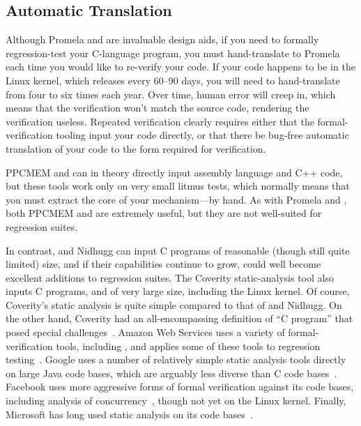 \subsection{Automatic Translation}
\label{sec:future:Automatic Translation}

Although Promela and 
are invaluable design aids, if you need to formally regression-test
your C-language program, you must hand-translate to Promela each time
you would like to re-verify your code.
If your code happens to be in the Linux kernel, which releases every
60--90 days, you will need to hand-translate from four to six times
each year.
Over time, human error will creep in, which means that the verification
won't match the source code, rendering the verification useless.
Repeated verification clearly requires either that the formal-verification
tooling input your code directly, or that there be bug-free automatic
translation of your code to the form required for verification.

PPCMEM and  can in theory directly input assembly language
and C++ code, but these tools work only on very small litmus tests,
which normally means that you must extract the core of your
mechanism---by hand.
As with Promela and , both PPCMEM and  are
extremely useful, but they are not well-suited for regression suites.

In contrast,  and Nidhugg can input C programs of reasonable
(though still quite limited) size, and if their capabilities continue
to grow, could well become excellent additions to regression suites.
The Coverity static-analysis tool also inputs C programs, and of very
large size, including the Linux kernel.
Of course, Coverity's static analysis is quite simple compared to that
of  and Nidhugg.
On the other hand, Coverity had an all-encompassing definition of
``C program'' that posed special challenges~\cite{AlBessey2010BillionLoCLater}.
Amazon Web Services uses a variety of formal-verification tools,
including , and applies some of these tools to regression
testing~\cite{ByronCook2018FormalAmazon}.
Google uses a number of relatively simple static analysis tools directly
on large Java code bases, which are arguably less diverse than C code
bases~\cite{CaitlinSadowski2018staticAnalysisGoogle}.
Facebook uses more aggressive forms of formal verification against its
code bases, including analysis of concurrency~\cite{DinoDistefano2019FBstaticAnalysis,PeterWOHearn2019incorrectnessLogic},
though not yet on the Linux kernel.
Finally, Microsoft has long used static analysis on its code
bases~\cite{JamesRLarus2004RightingSoftware}.

